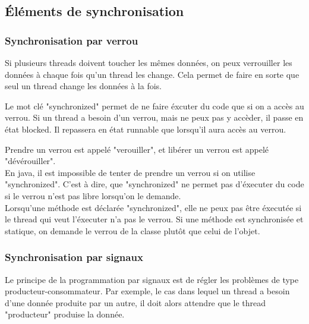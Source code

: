 \subsection{Éléments de synchronisation}
\subsubsection{Synchronisation par verrou}
Si plusieurs threads doivent toucher les mêmes données, on peux verrouiller les données à chaque fois qu'un thread
les change. Cela permet de faire en sorte que seul un thread change les données à la fois.

Le mot clé "synchronized" permet de ne faire éxcuter du code que si on a accès au verrou. Si un thread a besoin d'un
verrou, mais ne peux pas y accèder, il passe en état blocked. Il repassera en état runnable que lorsqu'il aura accès
au verrou.

Prendre un verrou est appelé "verouiller", et libérer un verrou est appelé "dévérouiller".\\
En java, il est impossible de tenter de prendre un verrou si on utilise "synchronized". C'est à dire, que
"synchronized" ne permet pas d'éxecuter du code si le verrou n'est pas libre lorsqu'on le demande.\\
Lorsqu'une méthode est déclarée "synchronized", elle ne peux pas être éxecutée si le thread qui veut l'éxecuter
n'a pas le verrou. Si une méthode est synchronisée et statique, on demande le verrou de la classe plutôt que celui
de l'objet.

\subsubsection{Synchronisation par signaux}

Le principe de la programmation par signaux est de régler les problèmes de type producteur-consommateur.
Par exemple, le cas dans lequel un thread a besoin d'une donnée produite par un autre, il doit alors attendre que
le thread "producteur" produise la donnée.
